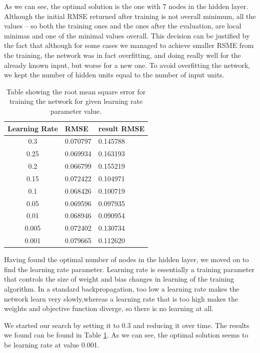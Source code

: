 As we can see, the optimal solution is the one with 7 nodes in the hidden layer. Although the initial RMSE returned after training is not overall minimum, all the values -- so both the training ones and the ones after the evaluation, are local minimas and one of the minimal values overall. This decision can be justified by the fact that although for some cases we managed to achieve smaller RSME from the training, the network was in fact overfitting, and doing really well for the already known input, but worse for a new one.
To avoid overfitting the network, we kept the number of hidden units equal to the number of input units. 

\begin{table}
\begin{center}
\begin{tabular} {| c | l | l |} \hline
 Learning Rate & RMSE & result RMSE \\  \hline \hline
 0.3 		& 0.070797 	& 0.145788	\\ \hline
 0.25 	& 0.069934  	& 0.163193	\\ \hline
 0.2 		&  0.066799	& 0.155219	\\ \hline
 0.15		& 0.072422	& 0.104971	\\ \hline
 0.1 		& 0.068426	& 0.100719	\\ \hline
 0.05 	& 0.069596	& 0.097935	\\ \hline
 0.01 	& 0.068946	& 0.090954	\\ \hline
 0.005 	& 0.072402	& 0.130734	\\ \hline
 0.001 	&  0.079665	& 0.112620	\\ \hline
\end{tabular}
\caption{Table showing the root mean square error for training the network for given learning rate parameter value.}
\label{table:learningrate}
\end{center}
\end{table}

Having found the optimal number of nodes in the hidden layer, we moved on to find the learning rate parameter. Learning rate is essentially a training parameter that controls the size of weight and bias changes in learning of the training algorithm. In a standard backpropagation, too low a learning rate makes the network learn very slowly,whereas a learning rate that is too high makes the weights and objective function diverge, so there is no learning at all. 

We started our search by setting it to 0.3 and reducing it over time. The results we found can be found in Table \ref{table:learningrate}. As we can see, the optimal solution seems to be learning rate at value 0.001.


